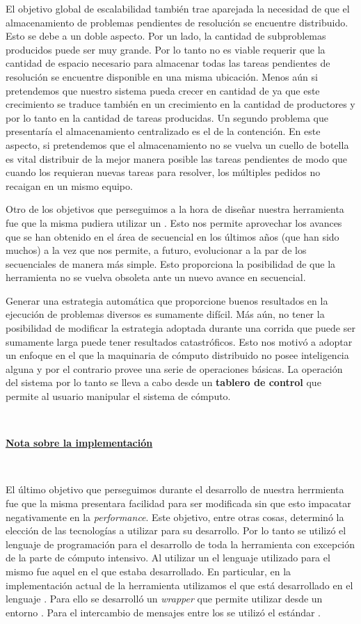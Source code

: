 El objetivo global de escalabilidad también trae aparejada la necesidad de que
el almacenamiento de problemas pendientes de resolución se encuentre
distribuido. Esto se debe a un doble aspecto. Por un lado, la cantidad de
subproblemas producidos puede ser muy grande. Por lo tanto no es viable
requerir que la cantidad de espacio necesario para almacenar todas las tareas
pendientes de resolución se encuentre disponible en una misma ubicación. Menos aún
si pretendemos que nuestro sistema pueda crecer en cantidad de \ws ya que este
crecimiento se traduce también en un crecimiento en la cantidad de productores
y por lo tanto en la cantidad de tareas producidas. Un segundo problema que
presentaría el almacenamiento centralizado es el de la contención. En este
aspecto, si pretendemos que el almacenamiento no se vuelva un cuello de
botella es vital distribuir de la mejor manera posible las tareas pendientes
de modo que cuando los \ws requieran nuevas tareas para resolver, los
múltiples pedidos no recaigan en un mismo equipo.


Otro de los objetivos que perseguimos a la hora de diseñar nuestra herramienta
fue que la misma pudiera utilizar un \ssolver \ots. Esto nos permite
aprovechar los avances que se han obtenido en el área de \ssolving secuencial
en los últimos años (que han sido muchos) a la vez que nos permite, a futuro,
evolucionar a la par de los \ssolvers secuenciales de manera más simple. Esto
proporciona la posibilidad de que la herramienta no se vuelva obsoleta ante un
nuevo avance en \ssolving secuencial.

Generar una estrategia automática que proporcione buenos resultados en la
ejecución de problemas diversos es sumamente difícil. Más aún, no tener la
posibilidad de modificar la estrategia adoptada durante una corrida que puede
ser sumamente larga puede tener resultados catastróficos. Esto nos motivó a
adoptar un enfoque en el que la maquinaria de cómputo distribuido no posee
inteligencia alguna y por el contrario provee una serie de operaciones
básicas. La operación del sistema por lo tanto se lleva a cabo desde un
\textbf{tablero de control} que permite al usuario manipular el sistema de
cómputo.

\

\noindent\underline{\textbf{Nota sobre la implementación}}

\

El último objetivo que perseguimos durante el desarrollo de nuestra herrmienta
fue que la misma presentara facilidad para ser modificada sin que esto
impacatar negativamente en la \emph{performance}. Este objetivo, entre otras
cosas, determinó la elección de las tecnologías a utilizar para su desarrollo.
Por lo tanto se utilizó el lenguaje de programación \Python para el desarrollo
de toda la herramienta con excepción de la parte de cómputo intensivo. Al
utilizar un \ssolver \ots el lenguaje utilizado para el mismo fue aquel en el
que estaba desarrollado. En particular, en la implementación actual de la
herramienta utilizamos el \ssolver \minisatdosveinte que está desarrollado en
el lenguaje \cpp. Para ello se desarrolló un \emph{wrapper} que permite
utilizar \minisat desde un entorno \Python. Para el intercambio de mensajes
entre los \ws se utilizó el estándar \mpi.


